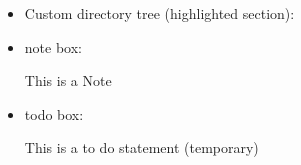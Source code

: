 \begin{itemize}
\item \begin{minipage}[t]{\textwidth} 
Custom directory tree (highlighted section):
\begin{latexbox}
\begin{tcustomdir}
\end{tcustomdir}
\end{latexbox}
\end{minipage}


\item \begin{minipage}[t]{\textwidth} 
note box:
\begin{latexbox}
\begin{note}
This is a Note
\end{note}
\end{latexbox}
\end{minipage}


\item \begin{minipage}[t]{\textwidth} 
todo box:
\begin{latexbox}
\begin{todo}
This is a to do statement (temporary)
\end{todo}
\end{latexbox}
\end{minipage}

\end{itemize}